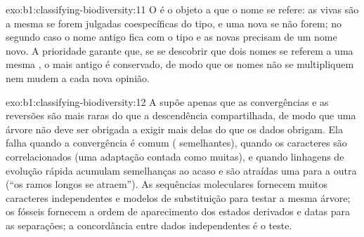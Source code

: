 \begin{solution}{exo:b1:classifying-biodiversity:11}
O  é o objeto a que o nome se refere: as  vivas
são a mesma  se forem julgadas coespecíficas do tipo, e uma
 nova se não forem; no segundo caso o nome antigo fica com o
tipo e as  novas precisam de um nome novo. A prioridade
garante que, se se descobrir que dois nomes se referem a uma mesma
, o mais antigo é conservado, de modo que os nomes não se
multipliquem nem mudem a cada nova opinião.
\end{solution}

\begin{solution}{exo:b1:classifying-biodiversity:12}
A  supõe apenas que as convergências e as reversões são mais
raras do que a descendência compartilhada, de modo que uma árvore não
deve ser obrigada a exigir mais delas do que os dados obrigam. Ela
falha quando a convergência é comum ( semelhantes), quando os
caracteres são correlacionados (uma adaptação contada como muitas), e
quando linhagens de evolução rápida acumulam semelhanças ao acaso e
são atraídas uma para a outra (``os ramos longos se atraem''). As
sequências moleculares fornecem muitos caracteres independentes e
modelos de substituição para testar a mesma árvore; os fósseis
fornecem a ordem de aparecimento dos estados derivados e datas para as
separações; a concordância entre dados independentes é o teste.
\end{solution}

